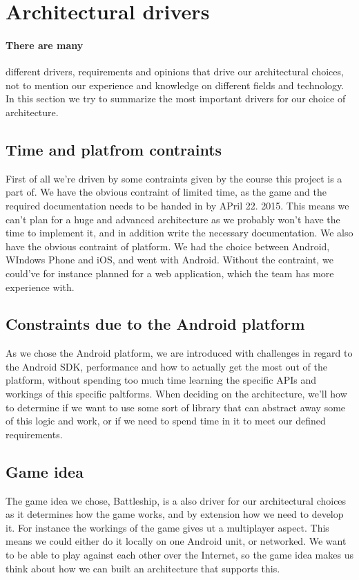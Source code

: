 \section{Architectural drivers}
\paragraph{There are many} different drivers, requirements and opinions that drive our architectural choices, not to mention our experience and knowledge on different fields and technology. In this section we try to summarize the most important drivers for our choice of architecture. 


\subsection{Time and platfrom contraints}
First of all we're driven by some contraints given by the course this project is a part of.  We have the obvious contraint of limited time, as the game and the required documentation needs to be handed in by APril 22. 2015. This means we can't plan for a huge and advanced architecture as we probably won't have the time to implement it, and in addition write the necessary documentation. We also have the obvious contraint of platform. We had the choice between Android, WIndows Phone and iOS, and went with Android. Without the contraint, we could've for instance planned for a web application, which the team has more experience with.

\subsection{Constraints due to the Android platform}
As we chose the Android platform, we are introduced with challenges in regard to the Android SDK, performance and how to actually get the most out of the platform, without spending too much time learning the specific APIs and workings of this specific paltforms. When deciding on the architecture, we'll how to determine if we want to use some sort of library that can abstract away some of this logic and work, or if we need to spend time in it to meet our defined requirements.

\subsection{Game idea}
The game idea we chose, Battleship, is a also driver for our architectural choices as it determines how the game works, and by extension how we need to develop it. For instance the workings of the game gives ut a multiplayer aspect. This means we could either do it locally on one Android unit, or networked. We want to be able to play against each other over the Internet, so the game idea makes us think about how we can built an architecture that supports this.

